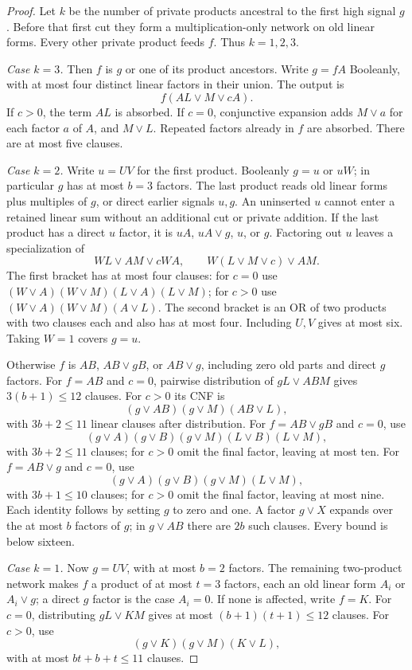 \documentclass[11pt]{article}
\theoremstyle{definition}
\theoremstyle{remark}
\begin{document}
\begin{proof}
Let $k$ be the number of private products ancestral to the first high signal $g$. Before that first cut they form a multiplication-only network on old linear forms. Every other private product feeds $f$. Thus $k=1,2,3$.

\emph{Case $k=3$.} Then $f$ is $g$ or one of its product ancestors. Write $g=fA$ Booleanly, with at most four distinct linear factors in their union. The output is
\[
 f(AL\vee M\vee cA).
\]
If $c>0$, the term $AL$ is absorbed. If $c=0$, conjunctive expansion adds $M\vee a$ for each factor $a$ of $A$, and $M\vee L$. Repeated factors already in $f$ are absorbed. There are at most five clauses.

\emph{Case $k=2$.} Write $u=UV$ for the first product. Booleanly $g=u$ or $uW$; in particular $g$ has at most $b=3$ factors. The last product reads old linear forms plus multiples of $g$, or direct earlier signals $u,g$. An uninserted $u$ cannot enter a retained linear sum without an additional cut or private addition. If the last product has a direct $u$ factor, it is $uA$, $uA\vee g$, $u$, or $g$. Factoring out $u$ leaves a specialization of
\[
 WL\vee AM\vee cWA,
 \qquad W(L\vee M\vee c)\vee AM.
\]
The first bracket has at most four clauses: for $c=0$ use
$(W\vee A)(W\vee M)(L\vee A)(L\vee M)$;
for $c>0$ use $(W\vee A)(W\vee M)(A\vee L)$.
The second bracket is an OR of two products with two clauses each and also has at most four. Including $U,V$ gives at most six. Taking $W=1$ covers $g=u$.

Otherwise $f$ is $AB$, $AB\vee gB$, or $AB\vee g$, including zero old parts and direct $g$ factors. For $f=AB$ and $c=0$, pairwise distribution of $gL\vee ABM$ gives $3(b+1)\le12$ clauses. For $c>0$ its CNF is
\[
 (g\vee AB)(g\vee M)(AB\vee L),
\]
with $3b+2\le11$ linear clauses after distribution. For $f=AB\vee gB$ and $c=0$, use
\[
 (g\vee A)(g\vee B)(g\vee M)(L\vee B)(L\vee M),
\]
with $3b+2\le11$ clauses; for $c>0$ omit the final factor, leaving at most ten. For $f=AB\vee g$ and $c=0$, use
\[
 (g\vee A)(g\vee B)(g\vee M)(L\vee M),
\]
with $3b+1\le10$ clauses; for $c>0$ omit the final factor, leaving at most nine. Each identity follows by setting $g$ to zero and one. A factor $g\vee X$ expands over the at most $b$ factors of $g$; in $g\vee AB$ there are $2b$ such clauses. Every bound is below sixteen.

\emph{Case $k=1$.} Now $g=UV$, with at most $b=2$ factors. The remaining two-product network makes $f$ a product of at most $t=3$ factors, each an old linear form $A_i$ or $A_i\vee g$; a direct $g$ factor is the case $A_i=0$. If none is affected, write $f=K$. For $c=0$, distributing $gL\vee KM$ gives at most $(b+1)(t+1)\le12$ clauses. For $c>0$, use
\[
 (g\vee K)(g\vee M)(K\vee L),
\]
with at most $bt+b+t\le11$ clauses.


\end{proof}
\end{document}
